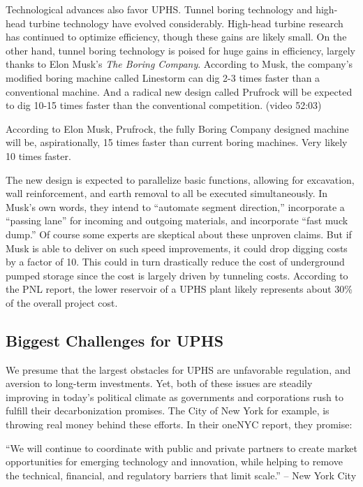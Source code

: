 \documentclass[hidelinks,12pt,a4paper]{article}
\begin{document}
Technological advances also favor UPHS. Tunnel boring technology and high-head turbine technology have evolved considerably. High-head turbine research has continued to optimize efficiency, though these gains are likely small. On the other hand, tunnel boring technology is poised for huge gains in efficiency, largely thanks to Elon Musk's \textit{The Boring Company}. According to Musk, the company's modified boring machine called Linestorm can dig 2-3 times faster than a conventional machine. And a radical new design called Prufrock will be expected to dig 10-15 times faster than the conventional competition.  \cite{TheBoringCompanyInformationSession} (video 52:03)

\begin{displayquote}
According to Elon Musk, Prufrock, the fully Boring Company designed machine will be, aspirationally, 15 times faster than current boring machines. Very likely 10 times faster.
\end{displayquote}

The new design is expected to parallelize basic functions, allowing for excavation, wall reinforcement, and earth removal to all be executed simultaneously. In Musk's own words, they intend to “automate segment direction,” incorporate a “passing lane” for incoming and outgoing materials, and incorporate “fast muck dump.” Of course some experts are skeptical about these unproven claims. \cite{ElonMuskTunnelingTechUnderLA} But if Musk is able to deliver on such speed improvements, it could drop digging costs by a factor of 10. This could in turn drastically reduce the cost of underground pumped storage since the cost is largely driven by tunneling costs. According to the PNL report, the lower reservoir of a UPHS plant likely represents about 30\% of the overall project cost.\cite{UndergroundPumpedHydroelectricStorage}

\subsection{Biggest Challenges for UPHS}
We presume that the largest obstacles for UPHS are unfavorable regulation, and aversion to long-term investments. Yet, both of these issues are steadily improving in today's political climate as governments and corporations rush to fulfill their decarbonization promises. The City of New York for example, is throwing real money behind these efforts. In their oneNYC report, they promise:

\begin{displayquote}
“We will continue to coordinate with public and private partners to create market opportunities for emerging technology and innovation, while helping to remove the technical, financial, and regulatory barriers that limit scale.” \cite{OneNYC2050FullReport} -- New York City
\end{displayquote}
\end{document}
